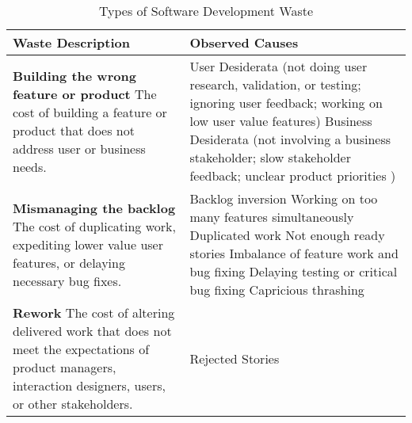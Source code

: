\begin{table*}[htbp]
\renewcommand{\arraystretch}{1.3}
\centering
\caption{Types of Software Development Waste}
\label{Waste}
\begin{tabular}{|p{2.5in}|p{3.6in}|} %
\hline
\textbf{Waste} \newline Description & Observed Causes                                                                                                                                                                                                                                                                                                                                                                                                                     \\ \hline
\textbf{Building the wrong feature or product} \newline
The cost of building a feature or product that does not address user or business needs. &
User Desiderata (not doing user research, validation, or testing; ignoring user feedback; working on low user value features) \newline 
Business Desiderata (not involving a business stakeholder; slow stakeholder feedback; unclear product priorities  )                                                                                                                                                                                \\ \hline
\textbf{Mismanaging the backlog  } \newline 
The cost of duplicating work, expediting lower value user features, or delaying necessary bug fixes.
& Backlog inversion \newline Working on too many features simultaneously \newline Duplicated work \newline Not enough ready stories  \newline Imbalance of feature work and bug fixing \newline Delaying testing or critical bug fixing  \newline Capricious thrashing                                                                                                                                                                                                                                                                                                                                \\ \hline
\textbf{Rework } 
\newline The cost of altering delivered work that does not meet the expectations of product managers, interaction designers, users, or other stakeholders.    & Rejected Stories \newline

\end{tabular}
\end{table*}
